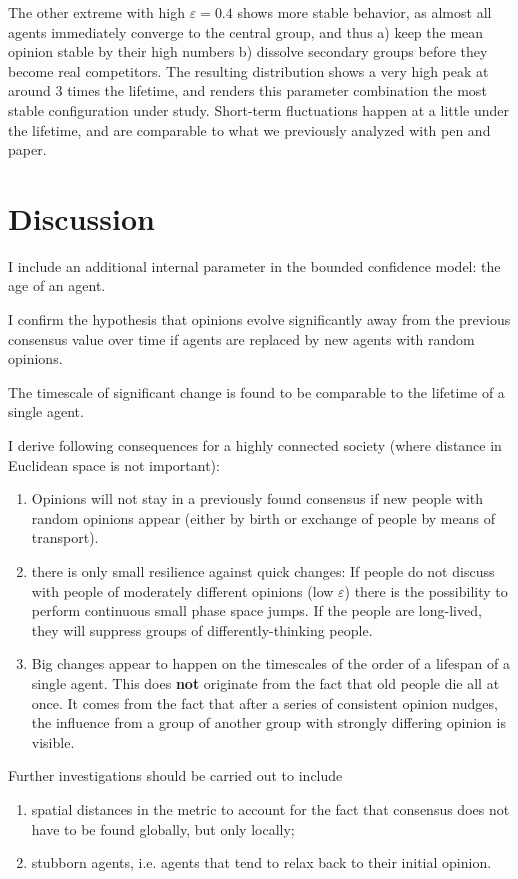 \documentclass[useAMS,usenatbib]{templates/mn2e}
\begin{document}
The other extreme with high $\varepsilon=0.4$ shows more stable
behavior, as almost all agents immediately converge to the central
group, and thus a) keep the mean opinion stable by their high numbers
b) dissolve secondary groups before they become real competitors. The
resulting distribution shows a very high peak at around 3 times the
lifetime, and renders this parameter combination the most stable
configuration under study. Short-term fluctuations happen at a little
under the lifetime, and are comparable to what we previously analyzed
with pen and paper.

\section{Discussion}
\label{sec:discussion}


I include an additional internal parameter in the bounded confidence
model: the age of an agent.

I confirm the hypothesis that opinions evolve significantly away
from the previous consensus value over time if agents
are replaced by new agents with random opinions.

The timescale of significant change is found to be comparable to the lifetime of a single agent.

I derive following consequences for a highly connected society (where distance in
Euclidean space is not important):

\begin{enumerate}
    \item Opinions will not stay in a previously found consensus if
    new people with random opinions appear (either by birth or
    exchange of people by means of transport).
    \item there is only small resilience against quick changes: If people
    do not discuss with people of moderately different opinions (low $\varepsilon$) there is the possibility to
    perform continuous small phase space jumps. If the people are
    long-lived, they will suppress groups of differently-thinking
    people.
    \item Big changes appear to happen on the timescales of the
    order of a lifespan of a single agent. This does {\bf not}
    originate from the fact that old people die all at once. It
    comes from the fact that after a series of consistent opinion
    nudges, the influence from a group of another group with strongly
    differing opinion is visible.
\end{enumerate}


Further investigations should be carried out to include

\begin{enumerate}
    \item spatial distances in the metric to account for the fact that
    consensus does not have to be found globally, but only locally;
    \item stubborn agents, i.e. agents that tend to relax back to their
    initial opinion.
\end{enumerate}
\end{document}
